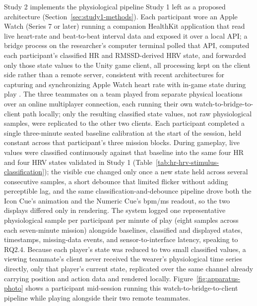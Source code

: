 \documentclass[manuscript,review,anonymous]{acmart}
\begin{document}
Study 2 implements the physiological pipeline Study 1 left as a proposed architecture (Section~\ref{sec:study1-methods}). Each participant wore an Apple Watch (Series 7 or later) running a companion HealthKit application that read live heart-rate and beat-to-beat interval data and exposed it over a local API; a bridge process on the researcher's computer terminal polled that API, computed each participant's classified HR and RMSSD-derived HRV state, and forwarded only those state values to the Unity game client, all processing kept on the client side rather than a remote server, consistent with recent architectures for capturing and synchronizing Apple Watch heart rate with in-game state during play \cite{lopes_architecture_2023}. The three teammates on a team played from separate physical locations over an online multiplayer connection, each running their own watch-to-bridge-to-client path locally; only the resulting classified state values, not raw physiological samples, were replicated to the other two clients. Each participant completed a single three-minute seated baseline calibration at the start of the session, held constant across that participant's three mission blocks. During gameplay, live values were classified continuously against that baseline into the same four HR and four HRV states validated in Study 1 (Table~\ref{tab:hr-hrv-stimulus-classification}); the visible cue changed only once a new state held across several consecutive samples, a short debounce that limited flicker without adding perceptible lag, and the same classification-and-debounce pipeline drove both the Icon Cue's animation and the Numeric Cue's bpm/ms readout, so the two displays differed only in rendering. The system logged one representative physiological sample per participant per minute of play (eight samples across each seven-minute mission) alongside baselines, classified and displayed states, timestamps, missing-data events, and sensor-to-interface latency, speaking to RQ2.4. Because each player's state was reduced to two small classified values, a viewing teammate's client never received the wearer's physiological time series directly, only that player's current state, replicated over the same channel already carrying position and action data and rendered locally. Figure~\ref{fig:apparatus-photo} shows a participant mid-session running this watch-to-bridge-to-client pipeline while playing alongside their two remote teammates.
\end{document}
